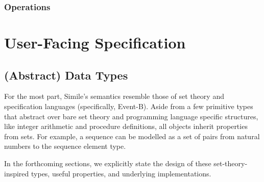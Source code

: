 \documentclass{article}
\begin{document}
\subsubsection{Operations}















\section{User-Facing Specification}

\subsection{(Abstract) Data Types}
For the most part, Simile's semantics resemble those of set theory and specification languages (specifically, Event-B). Aside from a few primitive types that abstract over bare set theory and programming language specific structures, like integer arithmetic and procedure definitions, all objects inherit properties from sets. For example, a sequence can be modelled as a set of pairs from natural numbers to the sequence element type.

In the forthcoming sections, we explicitly state the design of these set-theory-inspired types, useful properties, and underlying implementations.
\end{document}
